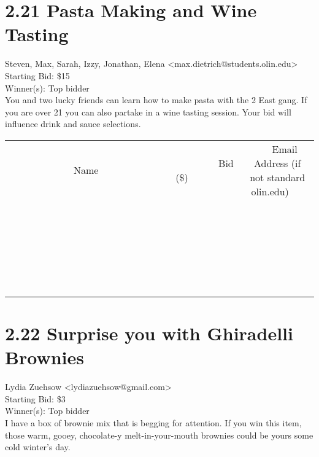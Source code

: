 \documentclass[11pt]{article}
\begin{document}
					\section*{2.21 Pasta Making and Wine Tasting}
					Steven, Max, Sarah, Izzy, Jonathan, Elena <max.dietrich@students.olin.edu> \\
					Starting Bid: \$15 \\
					Winner(s): Top bidder \\
					You and two lucky friends can learn how to make pasta with the 2 East gang.  If you are over 21 you can also partake in a wine tasting session.  Your bid will influence drink and sauce selections. \\
					[6ex]
					\begin{tabular}{c c c}
						~~~~~~~~~~~~~Name~~~~~~~~~~~~~ & ~~~~~~~~~Bid (\$)~~~~~~~~~ & ~~~Email Address (if not standard olin.edu)~~~ \\
				
 & & \\
\hline
 & & \\
\hline
 & & \\
\hline
 & & \\
\hline
 & & \\
\hline
 & & \\
\hline
 & & \\
\hline
 & & \\
\hline
 & & \\
\hline
 & & \\
\hline
 & & \\
\hline
 & & \\
\hline
 & & \\
\hline
 & & \\
\hline
 & & \\
\hline
 & & \\
\hline
 & & \\
\hline
 & & \\
\hline
 & & \\
\hline
 & & \\
\hline
 & & \\
\hline
 & & \\
\hline
 & & \\
\hline
 & & \\
\hline
 & & \\
\hline
 & & \\
\hline
					\end{tabular}
					\clearpage
				
					\section*{2.22 Surprise you with Ghiradelli Brownies}
					Lydia Zuehsow <lydiazuehsow@gmail.com> \\
					Starting Bid: \$3 \\
					Winner(s): Top bidder \\
					I have a box of brownie mix that is begging for attention. If you win this item, those warm, gooey, chocolate-y melt-in-your-mouth brownies could be yours some cold winter's day.
\end{document}

